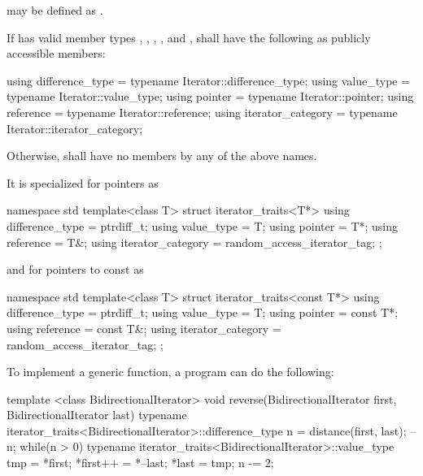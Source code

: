 may be defined as .

\pnum
If  has valid member
types , , ,
, and ,
shall have the following as publicly accessible members:
\begin{codeblock}
  using difference_type   = typename Iterator::difference_type;
  using value_type        = typename Iterator::value_type;
  using pointer           = typename Iterator::pointer;
  using reference         = typename Iterator::reference;
  using iterator_category = typename Iterator::iterator_category;
\end{codeblock}
Otherwise, 
shall have no members by any of the above names.

\pnum
It is specialized for pointers as

\begin{codeblock}
namespace std {
  template<class T> struct iterator_traits<T*> {
    using difference_type   = ptrdiff_t;
    using value_type        = T;
    using pointer           = T*;
    using reference         = T&;
    using iterator_category = random_access_iterator_tag;
  };
}
\end{codeblock}

and for pointers to const as

\begin{codeblock}
namespace std {
  template<class T> struct iterator_traits<const T*> {
    using difference_type   = ptrdiff_t;
    using value_type        = T;
    using pointer           = const T*;
    using reference         = const T&;
    using iterator_category = random_access_iterator_tag;
  };
}
\end{codeblock}

\pnum
\begin{example}
To implement a generic
function, a \Cpp program can do the following:

\begin{codeblock}
template <class BidirectionalIterator>
void reverse(BidirectionalIterator first, BidirectionalIterator last) {
  typename iterator_traits<BidirectionalIterator>::difference_type n =
    distance(first, last);
  --n;
  while(n > 0) {
    typename iterator_traits<BidirectionalIterator>::value_type
     tmp = *first;
    *first++ = *--last;
    *last = tmp;
    n -= 2;
  }
}
\end{codeblock}
\end{example}

